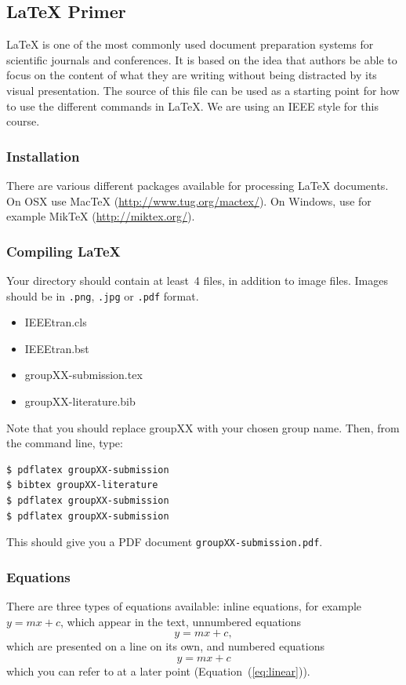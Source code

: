 \documentclass[10pt,conference,compsocconf]{IEEEtran}
\begin{document}
\subsection{\LaTeX{} Primer}
\label{sec:latex-primer}

\LaTeX{} is one of the most commonly used document preparation systems
for scientific journals and conferences. It is based on the idea
that authors be able to focus on the content of what they are
writing without being distracted by its visual presentation.
The source of this file can be used as a starting point for how to use
the different commands in \LaTeX{}. We are using an IEEE style for
this course.

\subsubsection{Installation}

There are various different packages available for processing \LaTeX{}
documents.
On OSX use Mac\TeX{}
(\url{http://www.tug.org/mactex/}). On Windows, use for example Mik\TeX{} (\url{http://miktex.org/}).

\subsubsection{Compiling \LaTeX{}}
Your directory should contain at least~4 files, in addition to image
files. Images should be in \texttt{.png}, \texttt{.jpg} or
\texttt{.pdf} format.
\begin{itemize}
\item IEEEtran.cls
\item IEEEtran.bst
\item groupXX-submission.tex
\item groupXX-literature.bib
\end{itemize}
Note that you should replace groupXX with your chosen group name.
Then, from the command line, type:
\begin{verbatim}
$ pdflatex groupXX-submission
$ bibtex groupXX-literature
$ pdflatex groupXX-submission
$ pdflatex groupXX-submission
\end{verbatim}
This should give you a PDF document \texttt{groupXX-submission.pdf}.

\subsubsection{Equations}

There are three types of equations available: inline equations, for
example $y=mx + c$, which appear in the text, unnumbered equations
$$y=mx + c,$$
which are presented on a line on its own, and numbered equations
\begin{equation}
  \label{eq:linear}
  y = mx + c
\end{equation}
which you can refer to at a later point (Equation~(\ref{eq:linear})).
\end{document}
